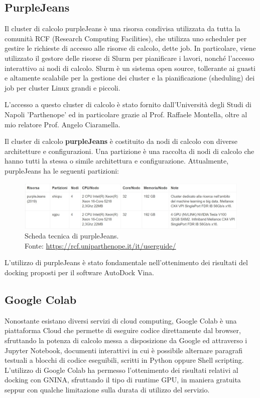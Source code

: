 \subsection{PurpleJeans}
Il cluster di calcolo purpleJeans è una risorsa condivisa utilizzata da tutta la comunità RCF (Research Computing Facilities), che utilizza uno scheduler per gestire le richieste di accesso alle risorse di calcolo, dette job. In particolare, viene utilizzato il gestore delle risorse di Slurm per pianificare i lavori, nonché l’accesso interattivo ai nodi di calcolo.
Slurm è un sistema open source, tollerante ai guasti e altamente scalabile per la gestione dei cluster e la pianificazione (sheduling) dei job per cluster Linux grandi e piccoli.

L'accesso a questo cluster di calcolo è stato fornito dall'Università degli Studi di Napoli 'Parthenope' ed in particolare grazie al Prof. Raffaele Montella, oltre al mio relatore Prof. Angelo Ciaramella.

Il cluster di calcolo \textbf{purpleJeans} è costituito da nodi di calcolo con diverse architetture e configurazioni. Una partizione è una raccolta di nodi di calcolo che hanno tutti la stessa o simile architettura e configurazione. Attualmente, purpleJeans ha le seguenti partizioni:

\begin{figure}[H]
    \centering
    \includegraphics[scale=0.5]{images/purple_jeans.jpg}
    \caption[Scheda tecnica di purpleJeans.]{Scheda tecnica di purpleJeans. \\
    Fonte: \url{https://rcf.uniparthenope.it/it/userguide/}}
    \label{fig:purple_jeans}
\end{figure}


L'utilizzo di purpleJeans è stato fondamentale nell'ottenimento dei risultati del docking proposti per il software AutoDock Vina.

\subsection{Google Colab}
Nonostante esistano diversi servizi di cloud computing, Google Colab è una piattaforma Cloud che permette di eseguire codice direttamente dal browser, sfruttando la potenza di calcolo messa a disposizione da Google ed attraverso i Jupyter Notebook, documenti interattivi in cui è possibile alternare paragrafi testuali a blocchi di codice eseguibili, scritti in Python oppure Shell scripting. 
L'utilizzo di Google Colab ha permesso l'ottenimento dei risultati relativi al docking con GNINA, sfruttando il tipo di runtime GPU, in maniera gratuita seppur con qualche limitazione sulla durata di utilizzo del servizio. 
